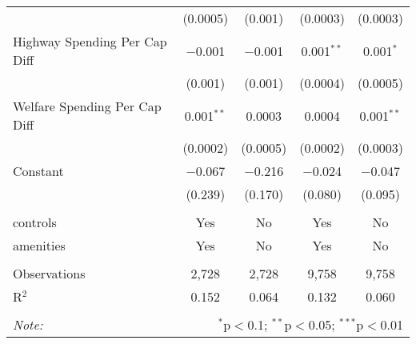 \begin{table}[!htbp]
\begin{tabular}{@{\extracolsep{5pt}}lcccc}
  & (0.0005) & (0.001) & (0.0003) & (0.0003) \\ 
  Highway Spending Per Cap Diff & $-$0.001 & $-$0.001 & 0.001$^{**}$ & 0.001$^{*}$ \\ 
  & (0.001) & (0.001) & (0.0004) & (0.0005) \\ 
  Welfare Spending Per Cap Diff & 0.001$^{**}$ & 0.0003 & 0.0004 & 0.001$^{**}$ \\ 
  & (0.0002) & (0.0005) & (0.0002) & (0.0003) \\ 
  Constant & $-$0.067 & $-$0.216 & $-$0.024 & $-$0.047 \\ 
  & (0.239) & (0.170) & (0.080) & (0.095) \\ 
 \hline \\[-1.8ex] 
controls & Yes & No & Yes & No \\ 
amenities & Yes & No & Yes & No \\ 
\hline \\[-1.8ex] 
Observations & 2,728 & 2,728 & 9,758 & 9,758 \\ 
R$^{2}$ & 0.152 & 0.064 & 0.132 & 0.060 \\ 
\hline 
\hline \\[-1.8ex] 
\textit{Note:}  & \multicolumn{4}{r}{$^{*}$p$<$0.1; $^{**}$p$<$0.05; $^{***}$p$<$0.01} \\ 
\end{tabular} 
\end{table} 

